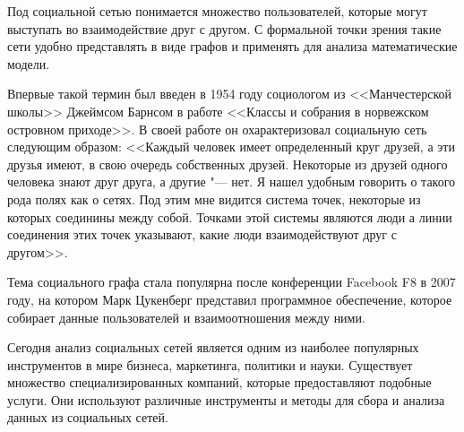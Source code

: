 Под социальной сетью понимается множество пользователей, которые могут выступать во взаимодействие друг с другом. С формальной точки зрения такие сети удобно представлять в виде графов и применять для анализа математические модели.

Впервые такой термин был введен в 1954 году социологом из <<Манчестерской школы>> Джеймсом Барнсом в работе <<Классы и собрания в норвежском островном приходе>>. В своей работе он охарактеризовал социальную сеть следующим образом: <<Каждый человек имеет определенный круг друзей, а эти друзья имеют, в свою очередь собственных друзей. Некоторые из друзей одного человека знают друг друга, а другие "--- нет. Я нашел удобным говорить о такого рода полях как о сетях. Под этим мне видится система точек, некоторые из которых соединины между собой. Точками этой системы являются люди а линии соединения этих точек указывают, какие люди взаимодействуют друг с другом>>\cite{Sazanov}.

Тема социального графа стала популярна после конференции Facebook F8 в 2007 году, на котором Марк Цукенберг представил программное обеспечение, которое собирает данные пользователей и взаимоотношения между ними\cite{CBSNews}.

Сегодня анализ социальных сетей является одним из наиболее популярных инструментов в мире бизнеса, маркетинга, политики и науки. Существует множество специализированных компаний, которые предоставляют подобные услуги. Они используют различные инструменты и методы для сбора и анализа данных из социальных сетей.
